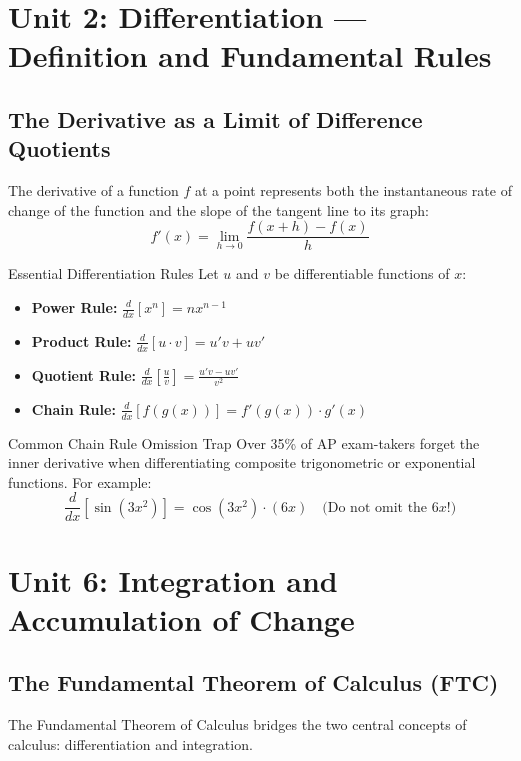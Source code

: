 ﻿\documentclass[11pt,oneside,openany]{book}
\begin{document}
\chapter{Unit 2: Differentiation --- Definition and Fundamental Rules}
\section{The Derivative as a Limit of Difference Quotients}
The derivative of a function $f$ at a point represents both the instantaneous rate of change of the function and the slope of the tangent line to its graph:
\[
f'(x) = \lim_{h \to 0} \frac{f(x + h) - f(x)}{h}
\]

\begin{theorembox}{Essential Differentiation Rules}
Let $u$ and $v$ be differentiable functions of $x$:
\begin{itemize}[leftmargin=1.5em]
  \item \textbf{Power Rule:} $\frac{d}{dx}[x^n] = n x^{n-1}$
  \item \textbf{Product Rule:} $\frac{d}{dx}[u \cdot v] = u' v + u v'$
  \item \textbf{Quotient Rule:} $\frac{d}{dx}\left[\frac{u}{v}\right] = \frac{u' v - u v'}{v^2}$
  \item \textbf{Chain Rule:} $\frac{d}{dx}[f(g(x))] = f'(g(x)) \cdot g'(x)$
\end{itemize}
\end{theorembox}

\begin{trapbox}{Common Chain Rule Omission Trap}
Over 35\% of AP exam-takers forget the inner derivative when differentiating composite trigonometric or exponential functions. For example:
\[
\frac{d}{dx}[\sin(3x^2)] = \cos(3x^2) \cdot (6x) \quad \text{(Do not omit the $6x$!)}
\]
\end{trapbox}

\chapter{Unit 6: Integration and Accumulation of Change}
\section{The Fundamental Theorem of Calculus (FTC)}
The Fundamental Theorem of Calculus bridges the two central concepts of calculus: differentiation and integration.
\end{document}
